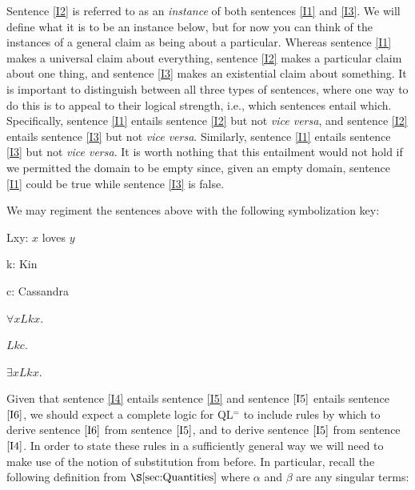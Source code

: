Sentence \ref{I2} is referred to as an \textit{instance} of both sentences \ref{I1} and \ref{I3}. %
We will define what it is to be an instance below, but for now you can think of the instances of a general claim as being about a particular.
Whereas sentence \ref{I1} makes a universal claim about everything, sentence \ref{I2} makes a particular claim about one thing, and sentence \ref{I3} makes an existential claim about something.
It is important to distinguish between all three types of sentences, where one way to do this is to appeal to their logical strength, i.e., which sentences entail which.
Specifically, sentence \ref{I1} entails sentence \ref{I2} but not \textit{vice versa}, and sentence \ref{I2} entails sentence \ref{I3} but not \textit{vice versa}.
Similarly, sentence \ref{I1} entails sentence \ref{I3} but not \textit{vice versa}.
It is worth nothing that this entailment would not hold if we permitted the domain to be empty since, given an empty domain, sentence \ref{I1} could be true while sentence \ref{I3} is false.


We may regiment the sentences above with the following symbolization key:

\begin{multicols}{2}
  
\begin{ekey}
  \item[Lxy:] $x$ loves $y$ 
  \item[k:] Kin
  \item[c:] Cassandra
\end{ekey}

\begin{earg}
  \item[\ex{I4}] $\forall xLkx$.
  \item[\ex{I5}] $Lkc$.
  \item[\ex{I6}] $\exists xLkx$.
\end{earg}

\end{multicols}

Given that sentence \ref{I4} entails sentence \ref{I5} and sentence $\ref{I5}$ entails sentence $\ref{I6}$, we should expect a complete logic for QL$^=$ to include rules by which to derive sentence $\ref{I6}$ from sentence $\ref{I5}$, and to derive sentence $\ref{I5}$ from sentence $\ref{I4}$. 
In order to state these rules in a sufficiently general way we will need to make use of the notion of substitution from before.
In particular, recall the following definition from $\S\ref{sec:Quantities}$ where $\alpha$ and $\beta$ are any singular terms:

